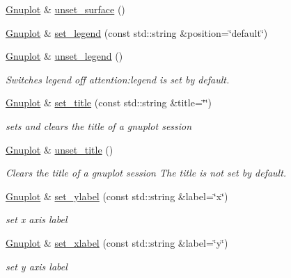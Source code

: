 \begin{DoxyCompactItemize}
\item 
\hyperlink{class_gnuplot}{Gnuplot} \& \hyperlink{class_gnuplot_a4ebddacbec61aa3e7bc4b89f508ad621}{unset\+\_\+surface} ()
\item 
\hyperlink{class_gnuplot}{Gnuplot} \& \hyperlink{class_gnuplot_ad64a717dac18167f656c4f09239973f8}{set\+\_\+legend} (const std\+::string \&position=\char`\"{}default\char`\"{})
\item 
\hyperlink{class_gnuplot}{Gnuplot} \& \hyperlink{class_gnuplot_ace901a18ab1a459213afd3ee0233b5ce}{unset\+\_\+legend} ()
\begin{DoxyCompactList}\small\item\em Switches legend off attention\+:legend is set by default. \end{DoxyCompactList}\item 
\hyperlink{class_gnuplot}{Gnuplot} \& \hyperlink{class_gnuplot_a4f93bac0e69dd83806652ca7226c6b3b}{set\+\_\+title} (const std\+::string \&title=\char`\"{}\char`\"{})
\begin{DoxyCompactList}\small\item\em sets and clears the title of a gnuplot session \end{DoxyCompactList}\item 
\hyperlink{class_gnuplot}{Gnuplot} \& \hyperlink{class_gnuplot_aca0aeb1dc0ac8d7e68ba6a15a977be28}{unset\+\_\+title} ()
\begin{DoxyCompactList}\small\item\em Clears the title of a gnuplot session The title is not set by default. \end{DoxyCompactList}\item 
\mbox{\label{class_gnuplot_afcb311938827f8718f19ed52d66bad7c}} 
\hyperlink{class_gnuplot}{Gnuplot} \& \hyperlink{class_gnuplot_afcb311938827f8718f19ed52d66bad7c}{set\+\_\+ylabel} (const std\+::string \&label=\char`\"{}x\char`\"{})
\begin{DoxyCompactList}\small\item\em set x axis label \end{DoxyCompactList}\item 
\mbox{\label{class_gnuplot_aa93589a95aeab869ba731e2583843ae4}} 
\hyperlink{class_gnuplot}{Gnuplot} \& \hyperlink{class_gnuplot_aa93589a95aeab869ba731e2583843ae4}{set\+\_\+xlabel} (const std\+::string \&label=\char`\"{}y\char`\"{})
\begin{DoxyCompactList}\small\item\em set y axis label \end{DoxyCompactList}\item 

\end{DoxyCompactItemize}
